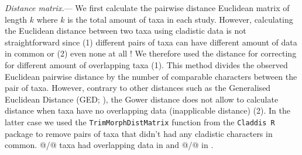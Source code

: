 \documentclass[12pt,letterpaper]{article}
\renewcommand{\subsubsection}[1]{%
\vspace{2ex}
\noindent
\textit{#1.}---}
\begin{document}
\subsubsection{Distance matrix}
We first calculate the pairwise distance Euclidean matrix of length $k$ where $k$ is the total amount of taxa in each study.
However, calculating the Euclidean distance between two taxa using cladistic data is not straightforward since (1) different pairs of taxa can have different amount of data in common or (2) even none at all \citep{anderson2012using}!
We therefore used the \cite{Gower71} distance for correcting for different amount of overlapping taxa (1).
This method divides the observed Euclidean pairwise distance by the number of comparable characters between the pair of taxa.
However, contrary to other distances such as the Generalised Euclidean Distance (GED; \citealt{Wills2001}), the Gower distance does not allow to calculate distance when taxa have no overlapping data (inapplicable distance) (2).
In the latter case we used the \texttt{TrimMorphDistMatrix} function from the \texttt{Claddis R} package \citep{Claddis} to remove pairs of taxa that didn't had any cladistic characters in common.
@/@ taxa had overlapping data in \cite{Slater2012MEE} and @/@ in \cite{beckancient2014}.
\end{document}
